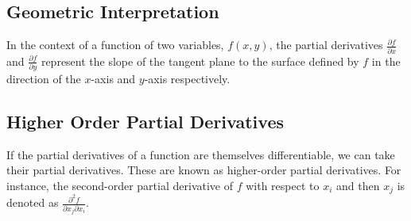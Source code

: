 \subsection{Geometric Interpretation}
In the context of a function of two variables, \( f(x, y) \), the partial derivatives \( \frac{\partial f}{\partial x} \) and \( \frac{\partial f}{\partial y} \) represent the slope of the tangent plane to the surface defined by \( f \) in the direction of the \( x \)-axis and \( y \)-axis respectively.

\subsection{Higher Order Partial Derivatives}
If the partial derivatives of a function are themselves differentiable, we can take their partial derivatives. These are known as higher-order partial derivatives. For instance, the second-order partial derivative of \( f \) with respect to \( x_i \) and then \( x_j \) is denoted as \( \frac{\partial^2 f}{\partial x_j \partial x_i} \).

